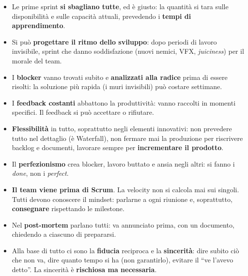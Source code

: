 \begin{itemize}
        strumenti di stima funzionano, se lo \emph{scope} è raggiungibile e come
        sta il team. Permette di tagliare per tempo e di arrivare in fondo
        \textbf{senza crunch}. L'andamento a dente di sega è normale.
  \item Le prime sprint \textbf{si sbagliano tutte}, ed è giusto: la quantità si
        tara sulle disponibilità e sulle capacità attuali, prevedendo i
        \textbf{tempi di apprendimento}.
  \item Si può \textbf{progettare il ritmo dello sviluppo}: dopo periodi di
        lavoro invisibile, sprint che danno soddisfazione (nuovi nemici, VFX,
        \emph{juiciness}) per il morale del team.
  \item I \textbf{blocker} vanno trovati subito e \textbf{analizzati alla
        radice} prima di essere risolti: la soluzione più rapida (i muri
        invisibili) può costare settimane.
  \item I \textbf{feedback costanti} abbattono la produttività: vanno raccolti in
        momenti specifici. Il feedback si può accettare o rifiutare.
  \item \textbf{Flessibilità} in tutto, soprattutto negli elementi innovativi:
        non prevedere tutto nel dettaglio (è Waterfall), non fermare mai la
        produzione per riscrivere backlog e documenti, lavorare sempre per
        \textbf{incrementare il prodotto}.
  \item Il \textbf{perfezionismo} crea blocker, lavoro buttato e ansia negli
        altri: si fanno i \emph{done}, non i \emph{perfect}.
  \item \textbf{Il team viene prima di Scrum}. La velocity non si calcola mai sui
        singoli. Tutti devono conoscere il mindset: parlarne a ogni riunione e,
        soprattutto, \textbf{consegnare} rispettando le milestone.
  \item Nel \textbf{post-mortem} parlano tutti: va annunciato prima, con un
        documento, chiedendo a ciascuno di prepararsi.
  \item Alla base di tutto ci sono la \textbf{fiducia} reciproca e la
        \textbf{sincerità}: dire subito ciò che non va, dire quanto tempo si ha
        (non garantirlo), evitare il ``ve l'avevo detto''. La sincerità è
        \textbf{rischiosa ma necessaria}.
\end{itemize}

